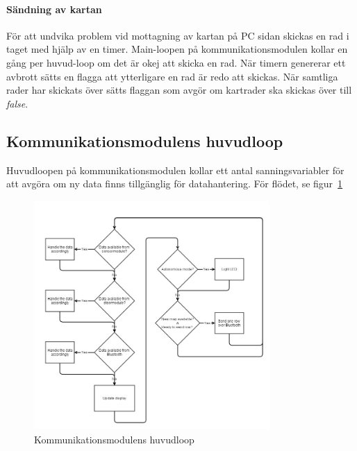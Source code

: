 \documentclass[a4paper,12pt,fleqn]{article}
\begin{document}
\paragraph{Sändning av kartan}
För att undvika problem vid mottagning av kartan på PC sidan skickas en rad i taget med hjälp av en timer. Main-loopen på kommunikationsmodulen kollar en gång per huvud-loop om det är okej att skicka en rad. När timern genererar ett avbrott sätts en flagga att ytterligare en rad är redo att skickas. När samtliga rader har skickats över sätts flaggan som avgör om kartrader ska skickas över till \emph{false}.
\newpage
\subsection{Kommunikationsmodulens huvudloop}

Huvudloopen på kommunikationsmodulen kollar ett antal sanningsvariabler för att avgöra om ny data finns tillgänglig för datahantering. För flödet, se figur~\ref{fig:mainmaster}

\begin{figure}[htp] %
  \begin{center}
  \includegraphics[keepaspectratio=true,width=0.8\textwidth]{bilder/mainmaster.jpg}  %
  \end{center}
  \caption{Kommunikationsmodulens huvudloop} %
  \label{fig:mainmaster}
\end{figure}
\end{document}
